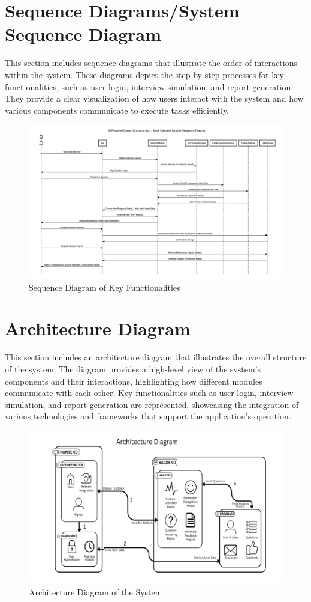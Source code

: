 \section{Sequence Diagrams/System Sequence Diagram} This section includes sequence diagrams that illustrate the order of interactions within the system. These diagrams depict the step-by-step processes for key functionalities, such as user login, interview simulation, and report generation. They provide a clear visualization of how users interact with the system and how various components communicate to execute tasks efficiently.

\begin{figure}[h] \centering \includegraphics[width=0.5\linewidth]{sections/diagrams/SequentialModel.png} \caption{Sequence Diagram of Key Functionalities} \label{fig
} \end{figure}

\section{Architecture Diagram} This section includes an architecture diagram that illustrates the overall structure of the system. The diagram provides a high-level view of the system's components and their interactions, highlighting how different modules communicate with each other. Key functionalities such as user login, interview simulation, and report generation are represented, showcasing the integration of various technologies and frameworks that support the application’s operation.

\begin{figure}[h] \centering \includegraphics[width=0.5\linewidth]{sections/diagrams/ArchitectureDiagram.png} \caption{Architecture Diagram of the System} \label{fig
} \end{figure}

